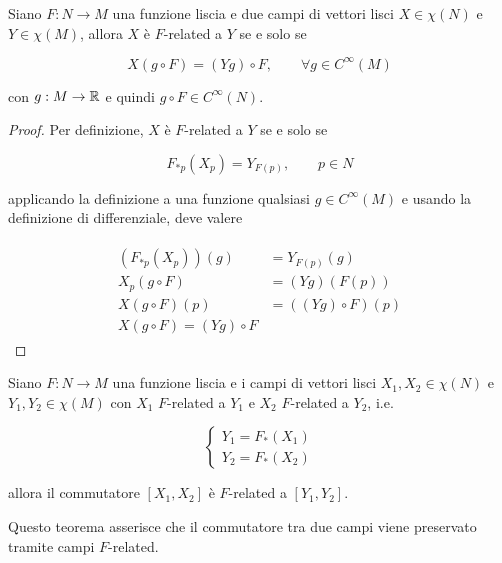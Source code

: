 \begin{theorem}
	Siano $ F : N \to M $ una funzione liscia e due campi di vettori lisci $ X \in \chi(N) $ e $ Y \in \chi(M) $, allora $ X $ è $ F $-related a $ Y $ se e solo se
	
	\begin{equation}
		X(g \circ F) = (Y g) \circ F, \qquad \forall g \in C^{\infty}(M)
	\end{equation}

	con $ g : M \to \mathbb{R} $ e quindi $ g \circ F \in C^{\infty}(N) $.
\end{theorem}

\begin{proof}
	Per definizione, $ X $ è $ F $-related a $ Y $ se e solo se
	
	\begin{equation}
		F_{*p}(X_{p}) = Y_{F(p)}, \qquad p \in N
	\end{equation}

	applicando la definizione a una funzione qualsiasi $ g \in C^{\infty}(M) $ e usando la definizione di differenziale, deve valere
	
	\begin{align}
		\begin{split}
			(F_{*p}(X_{p}))(g) &= Y_{F(p)}(g)\\
			X_{p}(g \circ F) &= (Y g)(F(p))\\
			X(g \circ F)(p) &= ((Y g) \circ F)(p)\\
			X(g \circ F) = (Y g) \circ F
		\end{split}
	\end{align}
\end{proof}

\begin{theorem}
	Siano $ F : N \to M $ una funzione liscia e i campi di vettori lisci $ X_{1},X_{2} \in \chi(N) $ e $ Y_{1},Y_{2} \in \chi(M) $ con $ X_{1} $ $ F $-related a $ Y_{1} $ e $ X_{2} $ $ F $-related a $ Y_{2} $, i.e.
	
	\begin{equation}
		\begin{cases}
			Y_{1} = F_{*}(X_{1})\\
			Y_{2} = F_{*}(X_{2})
		\end{cases}
	\end{equation}

	allora il commutatore $ [X_{1},X_{2}] $ è $ F $-related a $ [Y_{1},Y_{2}] $.
\end{theorem}

Questo teorema asserisce che il commutatore tra due campi viene preservato tramite campi $ F $-related.

